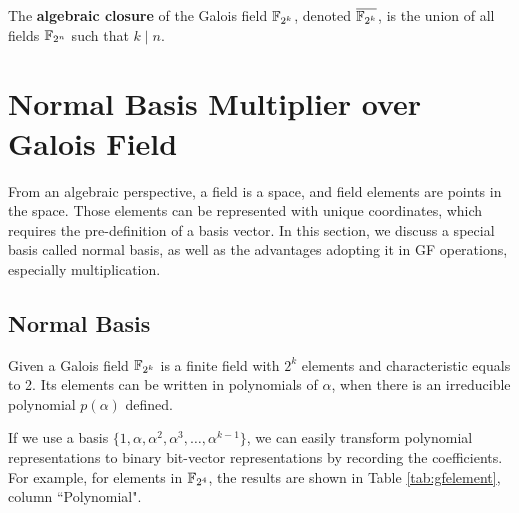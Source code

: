 \begin{Definition}
The {\bf algebraic closure} of the Galois field ${\mathbb{F}}_{2^k}$, denoted $\overline{{\mathbb{F}}_{2^k}}$, is the 
union of all fields ${\mathbb{F}}_{2^n}$ such that $k \mid n$.
\end{Definition}

\section{Normal Basis Multiplier over Galois Field}
From an algebraic perspective, a field is a space, and field elements are points in the space. Those elements can be 
represented with unique coordinates, which requires the pre-definition of a basis vector. In this
section, we discuss a special basis called normal basis, as well as the advantages adopting it in 
GF operations, especially multiplication.
\subsection{Normal Basis}
Given a Galois field ${\mathbb{F}}_{2^k}$ is a finite field with  $2^k$ elements and characteristic equals to 2.
Its elements can be written in polynomials of $\alpha$, when there is an irreducible polynomial $p(\alpha)$
defined.

If we use a basis $\{1,\alpha,\alpha^2,\alpha^3,\dots,\alpha^{k-1}\}$, we can easily transform polynomial representations
to binary bit-vector representations by recording the coefficients. For example, for elements in
${\mathbb{F}}_{2^4}$, the results are shown in Table \ref{tab:gfelement}, column ``Polynomial".


